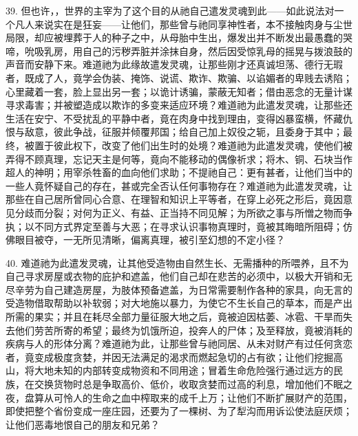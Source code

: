 39. 但也许，，世界的主宰为了这个目的从祂自己遣发灵魂到此——如此说法对一个凡人来说实在是狂妄——让他们，那些曾与祂同享神性者，本不接触肉身与尘世局限，却应被埋葬于人的种子之中，从母胎中生出，爆发出并不断发出最愚蠢的哭啼，吮吸乳房，用自己的污秽弄脏并涂抹自身，然后因受惊乳母的摇晃与拨浪鼓的声音而安静下来。难道祂为此缘故遣发灵魂，让那些刚才还真诚坦荡、德行无瑕者，既成了人，竟学会伪装、掩饰、说谎、欺诈、欺骗、以谄媚者的卑贱去诱陷；心里藏着一套，脸上显出另一套；以诡计诱骗，蒙蔽无知者；借由恶念的无量计谋寻求毒害；并被塑造成以欺诈的多变来适应环境？难道祂为此遣发灵魂，让那些还生活在安宁、不受扰乱的平静中者，竟在肉身中找到理由，变得凶暴蛮横，怀藏仇恨与敌意，彼此争战，征服并倾覆邦国；给自己加上奴役之轭，且委身于其中；最终，被置于彼此权下，改变了他们出生时的处境？难道祂为此遣发灵魂，使他们被弄得不顾真理，忘记天主是何等，竟向不能移动的偶像祈求；将木、铜、石块当作超人的神明；用宰杀牲畜的血向他们求助；不提祂自己：更有甚者，让他们当中的一些人竟怀疑自己的存在，甚或完全否认任何事物存在？难道祂为此遣发灵魂，让那些在自己居所曾同心合意、在理智和知识上平等者，在穿上必死之形后，竟因意见分歧而分裂；对何为正义、有益、正当持不同见解；为所欲之事与所憎之物而争执；以不同方式界定至善与大恶；在寻求认识事物真理时，竟被其晦暗所阻碍；仿佛眼目被夺，一无所见清晰，偏离真理，被引至幻想的不定小径？\par

40. 难道祂为此遣发灵魂，让其他受造物由自然生长、无需播种的所喂养，且不为自己寻求房屋或衣物的庇护和遮盖，他们自己却在悲苦的必须中，以极大开销和无尽辛劳为自己建造房屋，为肢体预备遮盖，为日常需要制作各种的家具，向无言的受造物借取帮助以补软弱；对大地施以暴力，为使它不生长自己的草本，而是产出所需的果实；并且在耗尽全部力量征服大地之后，竟被迫因枯萎、冰雹、干旱而失去他们劳苦所寄的希望；最终为饥饿所迫，投奔人的尸体；及至释放，竟被消耗的疾病与人的形体分离？难道祂为此，让那些曾与祂同居、从未对财产有过任何贪恋者，竟变成极度贪婪，并因无法满足的渴求而燃起急切的占有欲；让他们挖掘高山，将大地未知的内部转变成物资和不同用途；冒着生命危险强行通过远方的民族，在交换货物时总是争取高价、低价，收取贪婪而过高的利息，增加他们不眠之夜，盘算从可怜人的生命之血中榨取来的成千上万；让他们不断扩展财产的范围，即使把整个省份变成一座庄园，还要为了一棵树、为了犁沟而用诉讼使法庭厌烦；让他们恶毒地恨自己的朋友和兄弟？\par

